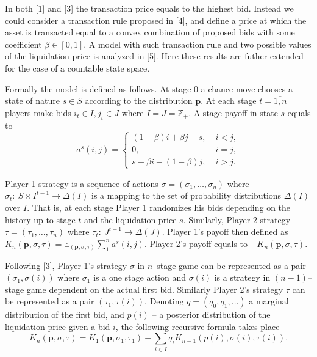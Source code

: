 In both [1] and [3] the transaction price equals to the highest bid. Instead we
could consider a transaction rule proposed in [4], and define a price at which
the asset is transacted equal to a convex combination of proposed bids with some
coefficient $\beta \in [0, 1]$. A model with such transaction rule and two
possible values of the liquidation price is analyzed in [5]. Here these results
are futher extended for the case of a countable state space.

Formally the model is defined as follows. At stage 0 a chance move chooses a
state of nature $s \in S$ according to the distribution $\mathbf{p}$. At each
stage $t = \overline{1,n}$ players make bids $i_t \in I, j_t \in J$ where
$I = J = \mathbb{Z}_+$. A stage payoff in state $s$ equals to
\begin{equation*}
  a^s(i, j) =
  \begin{cases}
    (1-\beta) i + \beta j - s, &\; i < j,\\
    0, &\; i = j,\\
    s - \beta i - (1-\beta) j, &\; i > j.
  \end{cases}
\end{equation*}

Player 1 strategy is a sequence of actions $\sigma = (\sigma_1, \ldots,
\sigma_n)$ where $\sigma_t:~S \times I^{t-1} \rightarrow \Delta(I)$ is a mapping
to the set of probability distributions $\Delta(I)$ over $I$. That is, at each
stage Player 1 randomizes his bids depending on the history up to stage $t$ and
the liquidation price $s$. Similarly, Player 2 strategy $\tau = (\tau_1, \ldots,
\tau_n)$ where $\tau_t:~J^{t-1} \rightarrow \Delta(J)$. Player 1's payoff then
defined as $K_n(\mathbf{p}, \sigma, \tau) = \mathbb{E}_{(\mathbf{p}, \sigma,
  \tau)} \sum_1^n a^s(i,j)$. Player 2's payoff equals to $-K_n(\mathbf{p},
\sigma, \tau)$.

Following [3], Player 1's strategy $\sigma$ in $n$--stage game can be
represented as a pair $(\sigma_1, \sigma(i))$ where $\sigma_1$ is a one stage
action and $\sigma(i)$ is a strategy in $(n-1)$--stage game dependent on the
actual first bid. Similarly Player 2's strategy $\tau$ can be represented as a
pair $(\tau_1, \tau(i))$. Denoting $q = (q_0, q_1, \ldots)$ a marginal
distribution of the first bid, and $p(i)$ -- a posterior distribution of the
liquidation price given a bid $i$, the following recursive formula takes place
\begin{equation*}
  K_n(\mathbf{p}, \sigma, \tau) = K_1(\mathbf{p}, \sigma_1, \tau_1) +
  \sum_{i \in I} q_i K_{n-1}(p(i), \sigma(i), \tau(i)).
\end{equation*}

